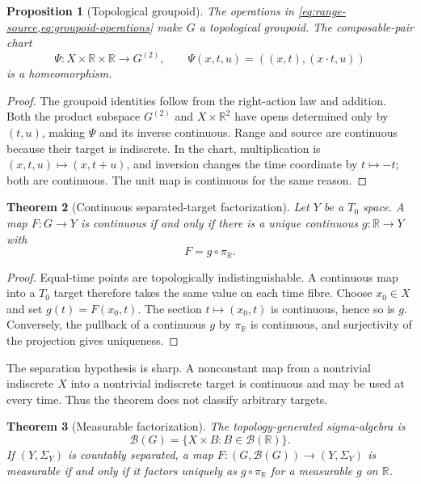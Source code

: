 \documentclass[11pt]{article}
\newtheorem{theorem}{Theorem}[section]
\newtheorem{proposition}[theorem]{Proposition}
\theoremstyle{definition}
\newcommand{\Borel}{\mathcal B}
\newcommand{\R}{\mathbb R}
\begin{document}
\begin{proposition}[Topological groupoid]
\label{prop:topological-groupoid}
The operations in \cref{eq:range-source,eq:groupoid-operations} make $G$ a
topological groupoid.  The composable-pair chart
\[
 \Psi:X\times\R\times\R\longrightarrow G^{(2)},\qquad
 \Psi(x,t,u)=((x,t),(x\cdot t,u))
\]
is a homeomorphism.
\end{proposition}

\begin{proof}
The groupoid identities follow from the right-action law and addition.
Both the product subspace $G^{(2)}$ and $X\times\R^2$ have opens determined
only by $(t,u)$, making $\Psi$ and its inverse continuous.  Range and source
are continuous because their target is indiscrete.  In the chart,
multiplication is $(x,t,u)\mapsto(x,t+u)$, and inversion changes the time
coordinate by $t\mapsto-t$; both are continuous.  The unit map is continuous
for the same reason.
\end{proof}

\begin{theorem}[Continuous separated-target factorization]
\label{thm:t0-factor}
Let $Y$ be a $T_0$ space.  A map $F:G\to Y$ is continuous if and only if
there is a unique continuous $g:\R\to Y$ with
\begin{equation}
 F=g\circ\pi_{\R}.
 \label{eq:continuous-factor}
\end{equation}
\end{theorem}

\begin{proof}
Equal-time points are topologically indistinguishable.  A continuous map
into a $T_0$ target therefore takes the same value on each time fibre.
Choose $x_0\in X$ and set $g(t)=F(x_0,t)$.  The section
$t\mapsto(x_0,t)$ is continuous, hence so is $g$.  Conversely, the pullback
of a continuous $g$ by $\pi_{\R}$ is continuous, and surjectivity of the
projection gives uniqueness.
\end{proof}

The separation hypothesis is sharp.  A nonconstant map from a nontrivial
indiscrete $X$ into a nontrivial indiscrete target is continuous and may be
used at every time.  Thus the theorem does not classify arbitrary targets.

\begin{theorem}[Measurable factorization]
\label{thm:measurable-factor}
The topology-generated sigma-algebra is
\begin{equation}
 \Borel(G)=\{X\times B:B\in\Borel(\R)\}.
 \label{eq:borel}
\end{equation}
If $(Y,\Sigma_Y)$ is countably separated, a map
$F:(G,\Borel(G))\to(Y,\Sigma_Y)$ is measurable if and only if it factors
uniquely as $g\circ\pi_{\R}$ for a measurable $g$ on $\R$.
\end{theorem}
\end{document}
